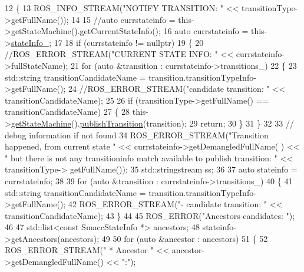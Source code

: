 \begin{DoxyCode}
12 \{
13     ROS\_INFO\_STREAM(\textcolor{stringliteral}{"NOTIFY TRANSITION: "} << transitionType->getFullName());
14 
15     \textcolor{comment}{//auto currstateinfo = this->getStateMachine().getCurrentStateInfo();}
16     \textcolor{keyword}{auto} currstateinfo = this->\hyperlink{classsmacc_1_1ISmaccState_af20df2cfd3aa826fe02a3d703dc63c1b}{stateInfo\_};
17 
18     \textcolor{keywordflow}{if} (currstateinfo != \textcolor{keyword}{nullptr})
19     \{
20         \textcolor{comment}{//ROS\_ERROR\_STREAM("CURRENT STATE INFO: " << currstateinfo->fullStateName);}
21         \textcolor{keywordflow}{for} (\textcolor{keyword}{auto} &transition : currstateinfo->transitions\_)
22         \{
23             std::string transitionCandidateName = transition.transitionTypeInfo->getFullName();
24             \textcolor{comment}{//ROS\_ERROR\_STREAM("candidate transition: " << transitionCandidateName);}
25 
26             \textcolor{keywordflow}{if} (transitionType->getFullName() == transitionCandidateName)
27             \{
28                 this->\hyperlink{classsmacc_1_1ISmaccState_a562bb3f9a3ac16b8be71e4794c9e7523}{getStateMachine}().\hyperlink{classsmacc_1_1ISmaccStateMachine_a06cc53c282c93692829b6efd28e315f4}{publishTransition}(transition);
29                 \textcolor{keywordflow}{return};
30             \}
31         \}
32 
33         \textcolor{comment}{// debug information if not found}
34         ROS\_ERROR\_STREAM(\textcolor{stringliteral}{"Transition happened, from current state "} << currstateinfo->getDemangledFullName(
      ) << \textcolor{stringliteral}{" but there is not any transitioninfo match available to publish transition: "} << transitionType->
      getFullName());
35         std::stringstream ss;
36 
37         \textcolor{keyword}{auto} stateinfo = currstateinfo;
38 
39         \textcolor{keywordflow}{for} (\textcolor{keyword}{auto} &transition : currstateinfo->transitions\_)
40         \{
41             std::string transitionCandidateName = transition.transitionTypeInfo->getFullName();
42             ROS\_ERROR\_STREAM(\textcolor{stringliteral}{"- candidate transition: "} << transitionCandidateName);
43         \}
44 
45         ROS\_ERROR(\textcolor{stringliteral}{"Ancestors candidates: "});
46 
47         std::list<const SmaccStateInfo *> ancestors;
48         stateinfo->getAncestors(ancestors);
49 
50         \textcolor{keywordflow}{for} (\textcolor{keyword}{auto} &ancestor : ancestors)
51         \{
52             ROS\_ERROR\_STREAM(\textcolor{stringliteral}{" * Ancestor "} << ancestor->getDemangledFullName() << \textcolor{stringliteral}{":"});

\end{DoxyCode}
